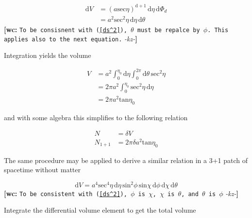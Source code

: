 \documentclass[preprint,notitlepage,amsmath,amssymb,floatfix]{revtex4-1}
\newcommand{\XXX}[3]{{\bf [#1: } {\tt #3} {\it -#2-}{\bf ]}}
\begin{document}
\begin{equation}
\begin{split}
\mathrm{d}V &= (a\mathrm{sec}\eta)^{\mathrm{d}+1} \, \mathrm{d}\eta \, \mathrm{d}\Phi_d \\
   &= a^2\mathrm{sec}^2\eta \, \mathrm{d}\eta \, \mathrm{d}\theta
\end{split}
\end{equation}
\XXX{wc}{kz}{To be consisnent with (\ref{ds^2}), $\theta$ must be repalce by $\phi$. This applies also to the next equation.}

\noindent Integration yields the volume

\begin{equation}
\begin{split}
V &= a^2\int_0^{\eta_0} \! \mathrm{d}\eta \int_0^{2\pi} \! \mathrm{d}\theta \, \mathrm{sec}^2\eta \\
  &= 2\pi a^2 \int_0^{\eta_0} \! \mathrm{sec}^2\eta \, \mathrm{d}\eta \\
  &= 2\pi a^2\mathrm{tan}\eta_0
\end{split}
\end{equation}

\noindent and with some algebra this simplifies to the following relation

\begin{equation}
\label{eq:finalN1}
\begin{split}
N &= \delta V \\
N_{\mathrm{1+1}} &= 2\pi\delta a^2 \mathrm{tan}\eta_0
\end{split}
\end{equation}

\noindent The same procedure may be applied to derive a similar relation in a 3+1 patch of spacetime without matter

\begin{equation}
\mathrm{d}V = a^4 \mathrm{sec}^4\eta \, \mathrm{d}\eta \, \mathrm{sin}^2\phi \, \mathrm{sin}\chi \, \mathrm{d}\phi \, \mathrm{d}\chi \, \mathrm{d}\theta
\end{equation}
\XXX{wc}{kz}{To be consistent with (\ref{ds^2}), $\phi$ is $\chi$, $\chi$ is $\theta$, and $\theta$ is $\phi$}

\noindent Integrate the differential volume element to get the total volume
\end{document}

